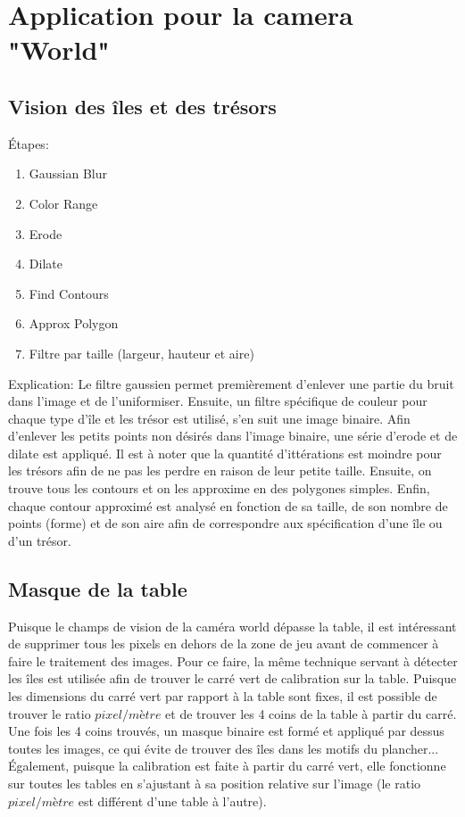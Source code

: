\section{Application pour la camera "World"} 

\subsection{Vision des îles et des trésors}

Étapes:
\begin{enumerate}
\item Gaussian Blur
\item Color Range
\item Erode
\item Dilate
\item Find Contours
\item Approx Polygon
\item Filtre par taille (largeur, hauteur et aire)
\end{enumerate}

Explication: Le filtre gaussien permet premièrement d'enlever une partie du bruit dans l'image et de l'uniformiser. Ensuite, un filtre spécifique de couleur pour chaque type d'île et les trésor est utilisé, s'en suit une image binaire. Afin d'enlever les petits points non désirés dans l'image binaire, une série d'erode et de dilate est appliqué. Il est à noter que la quantité d'ittérations est moindre pour les trésors afin de ne pas les perdre en raison de leur petite taille. Ensuite, on trouve tous les contours et on les approxime en des polygones simples. Enfin, chaque contour approximé est analysé en fonction de sa taille, de son nombre de points (forme) et de son aire afin de correspondre aux spécification d'une île ou d'un trésor. 

\subsection{Masque de la table}

Puisque le champs de vision de la caméra world dépasse la table, il est intéressant de supprimer tous les pixels en dehors de la zone de jeu avant de commencer à faire le traitement des images. Pour ce faire, la même technique servant à détecter les îles est utilisée afin de trouver le carré vert de calibration sur la table. Puisque les dimensions du carré vert par rapport à la table sont fixes, il est possible de trouver le ratio $pixel/mètre$ et de trouver les 4 coins de la table à partir du carré. Une fois les 4 coins trouvés, un masque binaire est formé et appliqué par dessus toutes les images, ce qui évite de trouver des îles dans les motifs du plancher... Également, puisque la calibration est faite à partir du carré vert, elle fonctionne sur toutes les tables en s'ajustant à sa position relative sur l'image (le ratio $pixel/mètre$ est différent d'une table à l'autre).


